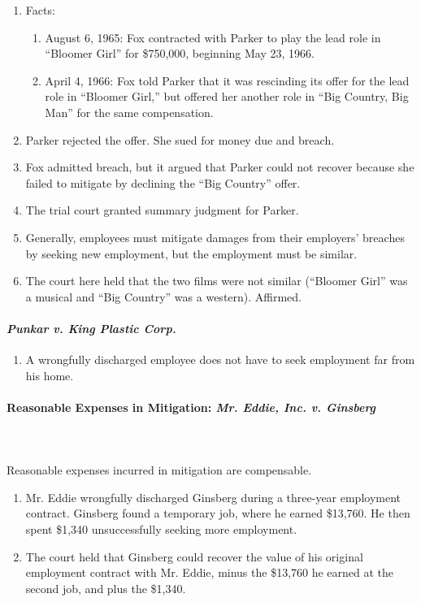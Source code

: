 \begin{enumerate}
    \item Facts:
    \begin{enumerate}
        \item August 6, 1965: Fox contracted with Parker to play the lead role 
        in ``Bloomer Girl'' for \$750,000, beginning May 23, 1966.
        \item April 4, 1966: Fox told Parker that it was rescinding its offer 
        for the lead role in ``Bloomer Girl,'' but offered her another role in 
        ``Big Country, Big Man'' for the same compensation.
    \end{enumerate}
    \item Parker rejected the offer. She sued for money due and breach.
    \item Fox admitted breach, but it argued that Parker could not recover 
    because she failed to mitigate by declining the ``Big Country'' offer.
    \item The trial court granted summary judgment for Parker.
    \item Generally, employees must mitigate damages from their employers' 
    breaches by seeking new employment, but the employment must be similar.
    \item The court here held that the two films were not similar (``Bloomer 
    Girl'' was a musical and ``Big Country'' was a western). Affirmed.
\end{enumerate}

\paragraph{\emph{Punkar v. King Plastic Corp.}}

\begin{enumerate}
    \item A wrongfully discharged employee does not have to seek employment 
    far from his home.
\end{enumerate}

\paragraph{Reasonable Expenses in Mitigation: \emph{Mr. Eddie, Inc. v. 
Ginsberg}}
~\\\\
Reasonable expenses incurred in mitigation are compensable.

\begin{enumerate}
    \item Mr. Eddie wrongfully discharged Ginsberg during a three-year 
    employment contract. Ginsberg found a temporary job, where he earned 
    \$13,760. He then spent \$1,340 unsuccessfully seeking more employment.
    \item The court held that Ginsberg could recover the value of his original 
    employment contract with Mr. Eddie, minus the \$13,760 he earned at the 
    second job, and plus the \$1,340.
\end{enumerate}


